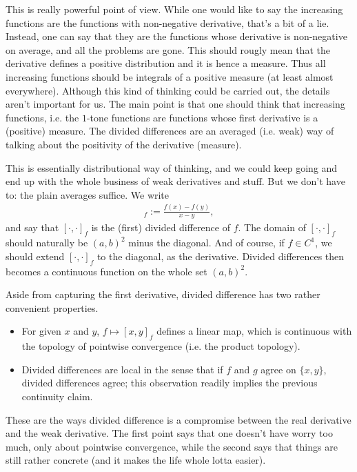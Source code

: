 This is really powerful point of view. While one would like to say the increasing functions are the functions with non-negative derivative, that's a bit of a lie. Instead, one can say that they are the functions whose derivative is non-negative on average, and all the problems are gone. This should rougly mean that the derivative defines a positive distribution and it is hence a measure. Thus all increasing functions should be integrals of a positive measure (at least almost everywhere). Although this kind of thinking could be carried out, the details aren't important for us. The main point is that one should think that increasing functions, i.e. the $1$-tone functions are functions whose first derivative is a (positive) measure. The divided differences are an averaged (i.e. weak) way of talking about the positivity of the derivative (measure).

This is essentially distributional way of thinking, and we could keep going and end up with the whole business of weak derivatives and stuff. But we don't have to: the plain averages suffice. We write
\begin{align*}
	[x, y]_{f} := \frac{f(x) - f(y)}{x - y},
\end{align*}
and say that $[\cdot, \cdot]_{f}$ is the (first) divided difference of $f$. The domain of $[\cdot, \cdot]_{f}$ should naturally be $(a, b)^{2}$ minus the diagonal. And of course, if $f \in C^{1}$, we should extend $[\cdot, \cdot]_{f}$ to the diagonal, as the derivative. Divided differences then becomes a continuous function on the whole set $(a, b)^2$.

Aside from capturing the first derivative, divided difference has two rather convenient properties.

\begin{itemize}
	\item For given $x$ and $y$, $f \mapsto [x, y]_{f}$ defines a linear map, which is continuous with the topology of pointwise convergence (i.e. the product topology).
	\item Divided differences are local in the sense that if $f$ and $g$ agree on $\{x, y\}$, divided differences agree; this observation readily implies the previous continuity claim.
\end{itemize}

These are the ways divided difference is a compromise between the real derivative and the weak derivative. The first point says that one doesn't have worry too much, only about pointwise convergence, while the second says that things are still rather concrete (and it makes the life whole lotta easier).

